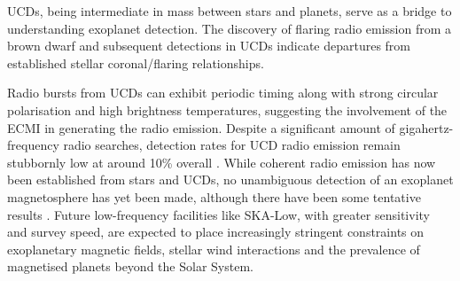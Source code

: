 UCDs, being intermediate in mass between stars and planets, serve as a bridge to understanding exoplanet detection. The discovery of flaring radio emission from a brown dwarf \citep{berger_discovery_2001} and subsequent detections in UCDs indicate departures from established stellar coronal/flaring relationships. \

Radio bursts from UCDs can exhibit periodic timing \citep{hallinan_rotational_2006} along with strong circular polarisation and high brightness temperatures, suggesting the involvement of the ECMI in generating the radio emission. Despite a significant amount of gigahertz-frequency radio searches, detection rates for UCD radio emission remain stubbornly low at around 10\% overall \citep{lynch_radio_2016}. While coherent radio emission has now been established from stars and UCDs, no unambiguous detection of an exoplanet magnetosphere has yet been made, although there have been some tentative results \citep[e.g.][]{turner_tentative_2026}. Future low-frequency facilities like SKA-Low, with greater sensitivity and survey speed, are expected to place increasingly stringent constraints on exoplanetary magnetic fields, stellar wind interactions and the prevalence of magnetised planets beyond the Solar System.




